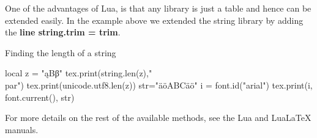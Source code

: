 One of the advantages of Lua, is that any library is just a table and hence can be extended easily. In the example above we extended the string library by adding the \textbf{line string.trim = trim}.  




\begin{texexample}{Finding the length  of a string}{}
\begin{luacode*}
 local z = "ąΒβ"
 tex.print(string.len(z),"\\par")
 tex.print(unicode.utf8.len(z))
 str="äöABCäö"
 i = font.id("arial")
 tex.print(i, font.current(), str)
\end{luacode*}
\end{texexample}

For more details on the rest of the available methods, see the Lua and LuaLaTeX manuals.
